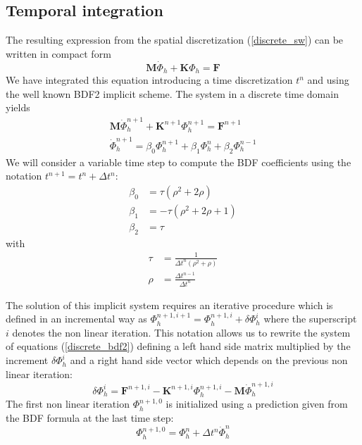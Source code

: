 \documentclass[a4paper,12pt]{article}
\begin{document}
\subsection{Temporal integration}

The resulting expression from the spatial discretization (\ref{discrete_sw}) can be written in compact form 
\begin{equation} \label{discrete_compact}
\mathbf{M}\dot{\Phi}_h + \mathbf{K}\Phi_h = \mathbf{F}
\end{equation}
We have integrated this equation introducing a time discretization $t^n$ and using the well known BDF2 implicit scheme. The system in a discrete time domain yields
\begin{equation}
\begin{split} \label{discrete_bdf2}
\mathbf{M}\dot{\Phi}_h^{n+1} + \mathbf{K}^{n+1}\Phi_h^{n+1} = \mathbf{F}^{n+1} \\
\dot{\Phi}_h^{n+1} = \beta_0 \Phi_h^{n+1} + \beta_1 \Phi_h^n + \beta_2 \Phi_h^{n-1}
\end{split}
\end{equation}
We will consider a variable time step to compute the BDF coefficients using the notation $t^{n+1} = t^n + \Delta t^n$:
\begin{equation}
\begin{split}
\beta_0 &= \tau (\rho^2 + 2\rho) \\
\beta_1 &= -\tau (\rho^2 + 2\rho + 1) \\
\beta_2 &= \tau
\end{split}
\end{equation}
with
\begin{equation}
\begin{split}
\tau &= \frac{1}{\Delta t^n(\rho^2 + \rho)} \\
\rho &= \frac{\Delta t^{n-1}}{\Delta t^n}
\end{split}
\end{equation}

The solution of this implicit system requires an iterative procedure which is defined in an incremental way as
$\Phi_h^{n+1,i+1} = \Phi_h^{n+1,i} + \delta\Phi_h^i$
where the superscript $i$ denotes the non linear iteration. This notation allows us to rewrite the system of equations (\ref{discrete_bdf2}) defining a left hand side matrix multiplied by the increment $\delta\Phi_h^i$ and a right hand side vector which depends on the previous non linear iteration:
\begin{equation}
[\beta_0\mathbf{M} + \mathbf{K}^{n+1}] \delta\Phi_h^i
= \mathbf{F}^{n+1,i} - \mathbf{K}^{n+1,i}\Phi_h^{n+1,i} - \mathbf{M}\dot{\Phi}_h^{n+1,i}
\end{equation}
The first non linear iteration $\Phi_h^{n+1,0}$ is initialized using a prediction given from the BDF formula at the last time step:
\begin{equation}
\Phi_h^{n+1,0} = \Phi_h^n + \Delta t^n \dot{\Phi}_h^{n}
\end{equation}
\end{document}
